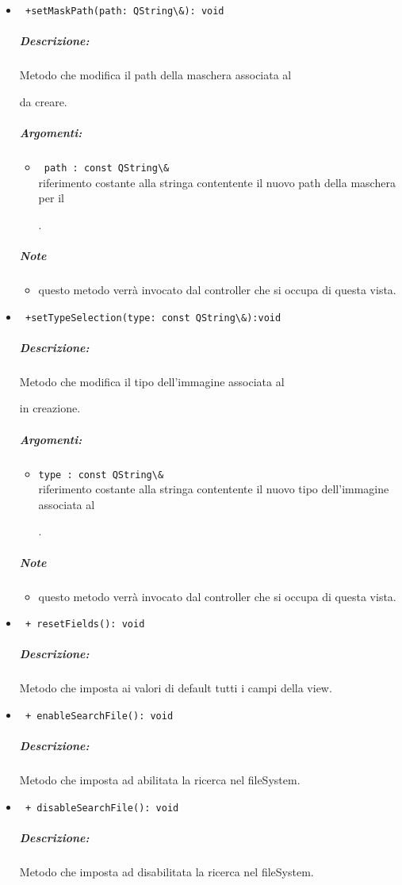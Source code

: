 \begin{itemize}
\item \color{blue}\verb! +setMaskPath(path: QString\&): void !
\color{black}
\subparagraph{Descrizione: }Metodo che modifica il path della maschera associata al \subject{} da creare. \\
  \subparagraph{Argomenti:}
 \begin{itemize}
\item \color{RoyalPurple} \verb! path : const QString\& !\\ riferimento costante alla stringa contentente il nuovo path della maschera per il \subject{}.
\end{itemize}
 \subparagraph{Note}
 \begin{itemize}
 \item questo metodo verrà invocato dal controller che si occupa di questa vista.
 \end{itemize}

\item \color{blue}\verb! +setTypeSelection(type: const QString\&):void! 
\color{black} 
\subparagraph{Descrizione: }Metodo che modifica il tipo dell'immagine associata al \subject{} in creazione. \\
  \subparagraph{Argomenti:}
 \begin{itemize}
\item \color{RoyalPurple} \verb!type : const QString\& !\\ riferimento costante alla stringa contentente il nuovo tipo dell'immagine associata al  \subject{}.
\end{itemize}
 \subparagraph{Note}
 \begin{itemize}
 \item questo metodo verrà invocato dal controller che si occupa di questa vista.
 \end{itemize}

\item \color{blue}\verb! + resetFields(): void!
\color{black}
\subparagraph{Descrizione: }Metodo che imposta ai valori di default tutti i campi della view.

\item \color{blue}\verb! + enableSearchFile(): void!
\color{black}
\subparagraph{Descrizione: }Metodo che imposta ad abilitata la ricerca nel fileSystem.

\item \color{blue}\verb! + disableSearchFile(): void!
\color{black}
\subparagraph{Descrizione: }Metodo che imposta ad disabilitata la ricerca nel fileSystem.


\end{itemize}
